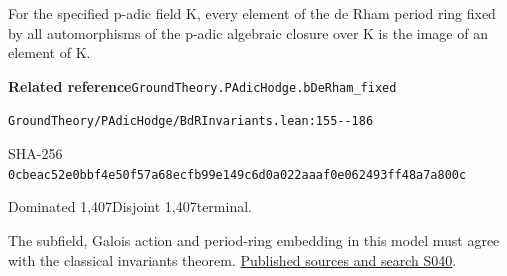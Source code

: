 
\begin{formalstatement}[D203]\label{decomp:D203}
For the specified p-adic field K, every element of the de Rham period ring fixed by all automorphisms of the p-adic algebraic closure over K is the image of an element of K.
\end{formalstatement}
{\small\raggedright\noindent\textsf{\bfseries Related reference}\quad \nolinkurl{GroundTheory.PAdicHodge.bDeRham_fixed}\par\noindent \nolinkurl{GroundTheory/PAdicHodge/BdRInvariants.lean:155--186}\par\noindent SHA-256 \nolinkurl{0cbeac52e0bbf4e50f57a68ecfb99e149c6d0a022aaaf0e062493ff48a7a800c}\par\noindent Dominated 1,407\quad Disjoint 1,407\quad terminal.\par}
The subfield, Galois action and period-ring embedding in this model must agree with the classical invariants theorem.
\hyperref[lit:S040]{Published sources and search S040}.
